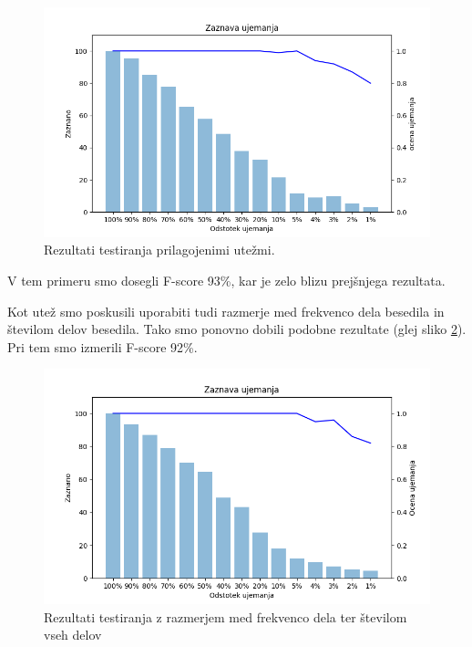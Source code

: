 \documentclass{acm_proc_article-sp}
\begin{document}
\begin{figure}[htb]
\begin{center}
\includegraphics[width=1\columnwidth]{ch_tfidf_weight_majhna.png}
\end{center}
\caption{\small{Rezultati testiranja prilagojenimi utežmi.}}
\label{fig:ch_tfidf}
\end{figure}

V tem primeru smo dosegli F-score 93\%, kar je zelo blizu prejšnjega rezultata.

Kot utež smo poskusili uporabiti tudi razmerje med frekvenco dela besedila in številom delov besedila. Tako smo ponovno dobili podobne rezultate (glej sliko \ref{fig:ch_freq}). Pri tem smo izmerili F-score 92\%.

\begin{figure}[htb]
\begin{center}
\includegraphics[width=1\columnwidth]{ch_freq_weight.png}
\end{center}
\caption{\small{Rezultati testiranja z razmerjem med frekvenco dela ter številom vseh delov}}
\label{fig:ch_freq}
\end{figure}
\end{document}
